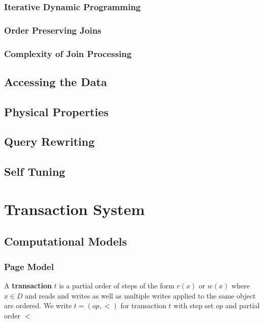 \documentclass[11pt]{article}
\begin{document}
\subsubsection{Iterative Dynamic Programming}
\label{sec:org2066834}
\subsubsection{Order Preserving Joins}
\label{sec:org1b219a2}
\subsubsection{Complexity of Join Processing}
\label{sec:orgbb96e65}
\subsection{Accessing the Data}
\label{sec:orgb0097a0}

\subsection{Physical Properties}
\label{sec:org305f68a}

\subsection{Query Rewriting}
\label{sec:org81c0ff4}

\subsection{Self Tuning}
\label{sec:orgdb64190}
\section{Transaction System}
\label{sec:org6a6d099}
\subsection{Computational Models}
\label{sec:org7590695}
\subsubsection{Page Model}
\label{sec:org4d93f82}
\begin{definition}
A \textbf{transaction} \(t\) is a partial order of steps of the form \(r(x)\) or \(w(x)\)
where \(x\in D\) and reads and writes as well as multiple writes applied to the same object are
ordered. We write \(t=(op,<)\) for transaction \(t\) with step set \(op\) and partial order \(<\)
\end{definition}
\end{document}
